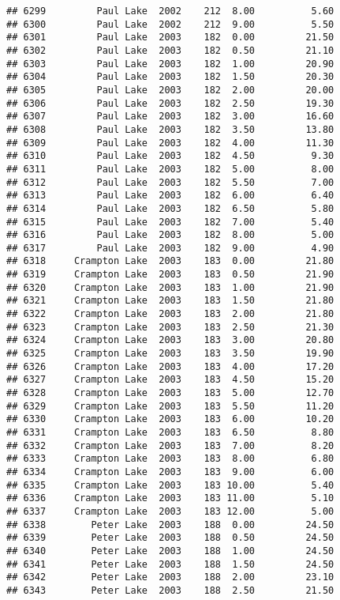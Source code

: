 \documentclass[
]{article}
\begin{document}
\begin{verbatim}
## 6299         Paul Lake  2002    212  8.00          5.60
## 6300         Paul Lake  2002    212  9.00          5.50
## 6301         Paul Lake  2003    182  0.00         21.50
## 6302         Paul Lake  2003    182  0.50         21.10
## 6303         Paul Lake  2003    182  1.00         20.90
## 6304         Paul Lake  2003    182  1.50         20.30
## 6305         Paul Lake  2003    182  2.00         20.00
## 6306         Paul Lake  2003    182  2.50         19.30
## 6307         Paul Lake  2003    182  3.00         16.60
## 6308         Paul Lake  2003    182  3.50         13.80
## 6309         Paul Lake  2003    182  4.00         11.30
## 6310         Paul Lake  2003    182  4.50          9.30
## 6311         Paul Lake  2003    182  5.00          8.00
## 6312         Paul Lake  2003    182  5.50          7.00
## 6313         Paul Lake  2003    182  6.00          6.40
## 6314         Paul Lake  2003    182  6.50          5.80
## 6315         Paul Lake  2003    182  7.00          5.40
## 6316         Paul Lake  2003    182  8.00          5.00
## 6317         Paul Lake  2003    182  9.00          4.90
## 6318     Crampton Lake  2003    183  0.00         21.80
## 6319     Crampton Lake  2003    183  0.50         21.90
## 6320     Crampton Lake  2003    183  1.00         21.90
## 6321     Crampton Lake  2003    183  1.50         21.80
## 6322     Crampton Lake  2003    183  2.00         21.80
## 6323     Crampton Lake  2003    183  2.50         21.30
## 6324     Crampton Lake  2003    183  3.00         20.80
## 6325     Crampton Lake  2003    183  3.50         19.90
## 6326     Crampton Lake  2003    183  4.00         17.20
## 6327     Crampton Lake  2003    183  4.50         15.20
## 6328     Crampton Lake  2003    183  5.00         12.70
## 6329     Crampton Lake  2003    183  5.50         11.20
## 6330     Crampton Lake  2003    183  6.00         10.20
## 6331     Crampton Lake  2003    183  6.50          8.80
## 6332     Crampton Lake  2003    183  7.00          8.20
## 6333     Crampton Lake  2003    183  8.00          6.80
## 6334     Crampton Lake  2003    183  9.00          6.00
## 6335     Crampton Lake  2003    183 10.00          5.40
## 6336     Crampton Lake  2003    183 11.00          5.10
## 6337     Crampton Lake  2003    183 12.00          5.00
## 6338        Peter Lake  2003    188  0.00         24.50
## 6339        Peter Lake  2003    188  0.50         24.50
## 6340        Peter Lake  2003    188  1.00         24.50
## 6341        Peter Lake  2003    188  1.50         24.50
## 6342        Peter Lake  2003    188  2.00         23.10
## 6343        Peter Lake  2003    188  2.50         21.50

\end{verbatim}
\end{document}
